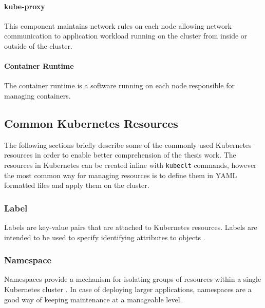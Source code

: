 \paragraph{kube-proxy} This component maintains network rules on each node allowing network communication to application workload running on the cluster from inside or outside of the cluster.

\paragraph{Container Runtime} The container runtime is a software running on each node responsible for managing containers.

\subsection{Common Kubernetes Resources}

The following sections briefly describe some of the commonly used Kubernetes resources in order to enable better comprehension of the thesis work. The resources in Kubernetes can be created inline with \texttt{kubeclt} commands, however the most common way for managing resources is to define them in YAML formatted files and apply them on the cluster.

\subsubsection{Label}

Labels are key-value pairs that are attached to Kubernetes resources. Labels are intended to be used to specify identifying attributes to objects \cite{KubernetesLabel}.

\subsubsection{Namespace}

Namespaces provide a mechanism for isolating groups of resources within a single Kubernetes cluster \cite{KubernetesNamespace}. In case of deploying larger applications, namespaces are a good way of keeping maintenance at a manageable level.

